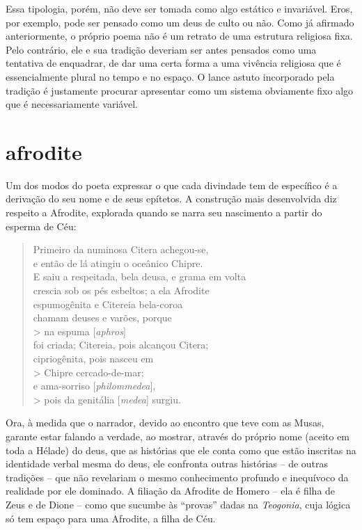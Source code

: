 Essa tipologia, porém, não deve ser tomada como algo estático e invariável.
Eros, por exemplo, pode ser pensado como um deus de culto ou não. Como já
afirmado anteriormente, o próprio poema não é um retrato de uma estrutura
religiosa fixa. Pelo contrário, ele e sua tradição deveriam ser
antes pensados como uma tentativa de enquadrar, de dar uma certa forma a uma
vivência religiosa que é essencialmente plural no tempo e no espaço. O lance
astuto incorporado pela tradição é justamente procurar apresentar como um
sistema obviamente fixo algo que é necessariamente variável.

\section{afrodite}

Um dos modos do poeta expressar o que cada divindade tem de específico é a
derivação do seu nome e de seus epítetos. A construção mais desenvolvida diz
respeito a Afrodite, explorada quando se narra seu nascimento a partir do
esperma de Céu:

\settowidth{\versewidth}{cipriogênita, pois nasceu em Chipre cercado-de-mar;}
\begin{verse} Primeiro da numinosa Citera achegou-se,\\ e então de lá atingiu o
oceânico Chipre.\\ E saiu a respeitada, bela deusa, e grama em volta \\ crescia
sob os pés esbeltos; a ela Afrodite\\ espumogênita e Citereia bela-coroa\\
chamam deuses e varões, porque\\> na espuma [\textit{aphros}]\\ foi criada;
Citereia, pois alcançou Citera;\\ cipriogênita, pois nasceu em\\> Chipre
cercado-de-mar;\\ e ama-sorriso [\textit{philommedea}],\\> pois da genitália
[\textit{medea}] surgiu.\\ \end{verse} 


Ora, à medida que o narrador, devido ao encontro que teve com as Musas, garante
estar falando a verdade, ao mostrar, através do próprio nome (aceito em toda a
Hélade) do deus, que as histórias que ele conta como que estão inscritas na
identidade verbal mesma do deus, ele confronta outras histórias – de outras
tradições – que não revelariam o mesmo conhecimento profundo e inequívoco da
realidade por ele dominado. A filiação da Afrodite de Homero – ela é filha de
Zeus e de Dione – como que sucumbe às “provas” dadas na \textit{Teogonia}, cuja
lógica só tem espaço para uma Afrodite, a filha de Céu.

